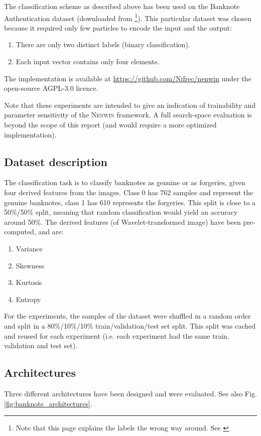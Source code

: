 The classification scheme as described above has been used on the Banknote Authentication dataset \cite{banknote_paper} (downloaded from \cite{banknote_download}\footnote{Note that this page explains the labels the wrong way around. See \cite{genuine_class_banknote}}).
This particular dataset was chosen because it required only few particles to encode the input and the output:
\begin{enumerate}
	\item There are only two distinct labels (binary classification).
	\item Each input vector contains only four elements.
\end{enumerate}

The implementation is available at \url{https://github.com/Nifrec/nenwin} under the open-source AGPL-3.0 licence\cite{AGPL_3}.

Note that these experiments are intended to give an indication of trainability and parameter sensitivity of the \textsc{Nenwin} framework. 
A full search-space evaluation is beyond the scope of this report (and would require a more optimized implementation).

\subsection{Dataset description}
The classification task is to classify banknotes as genuine or as forgeries, 
given four derived features from the images. 
Class 0 has 762 samples and represent the genuine banknotes,
class 1 has 610 represents the forgeries. 
This split is close to a 50\%/50\% split, meaning that random classification would yield an accuracy around 50\%.
The derived features (of Wavelet-transformed image) have been pre-computed, and are:
\begin{enumerate}
	\item Variance
	\item Skewness
	\item Kurtosis
	\item Entropy
\end{enumerate}

For the experiments, the samples of the dataset were shuffled in a random order and split in a 80\%/10\%/10\% train/validation/test set split. This split was cached and reused for each experiment (i.e. each experiment had the same train, validation and test set).

\subsection{Architectures}
Three different architectures have been designed and were evaluated. See also Fig. \ref{fig:banknote_architectures}.

